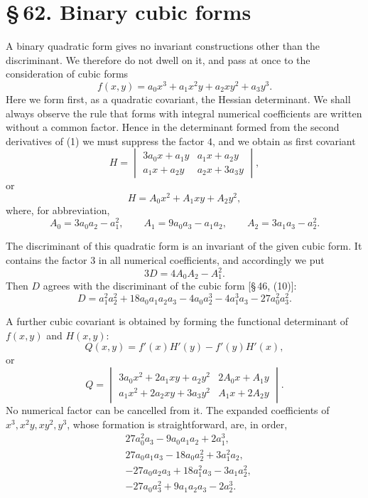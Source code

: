 \documentclass[11pt]{article}
\providecommand{\sect}[2]{\section*{\S\,#1. #2}}
\begin{document}
\clearpage

\sect{62}{Binary cubic forms}

A binary quadratic form gives no invariant constructions other than the discriminant. We therefore do not dwell on it, and pass at once to the consideration of cubic forms
\begin{equation}
 f(x,y)=a_0x^3+a_1x^2y+a_2xy^2+a_3y^3.
\tag{1}
\end{equation}
Here we form first, as a quadratic covariant, the Hessian determinant. We shall always observe the rule that forms with integral numerical coefficients are written without a common factor. Hence in the determinant formed from the second derivatives of (1) we must suppress the factor $4$, and we obtain as first covariant
\[
 H=\begin{vmatrix}
 3a_0x+a_1y & a_1x+a_2y\\
 a_1x+a_2y & a_2x+3a_3y
 \end{vmatrix},
\]
or
\begin{equation}
 H=A_0x^2+A_1xy+A_2y^2,
\tag{2}
\end{equation}
where, for abbreviation,
\begin{equation}
 A_0=3a_0a_2-a_1^2,
 \qquad
 A_1=9a_0a_3-a_1a_2,
 \qquad
 A_2=3a_1a_3-a_2^2.
\tag{3}
\end{equation}

The discriminant of this quadratic form is an invariant of the given cubic form. It contains the factor $3$ in all numerical coefficients, and accordingly we put
\begin{equation}
 3D=4A_0A_2-A_1^2.
\tag{4}
\end{equation}
Then $D$ agrees with the discriminant of the cubic form [\S\,46, (10)]:
\begin{equation}
 D=a_1^2a_2^2+18a_0a_1a_2a_3-4a_0a_2^3-4a_1^3a_3-27a_0^2a_3^2.
\tag{5}
\end{equation}

A further cubic covariant is obtained by forming the functional determinant of $f(x,y)$ and $H(x,y)$:
\begin{equation}
 Q(x,y)=f'(x)H'(y)-f'(y)H'(x),
\tag{6}
\end{equation}
or
\begin{equation}
 Q=\begin{vmatrix}
 3a_0x^2+2a_1xy+a_2y^2 & 2A_0x+A_1y\\
 a_1x^2+2a_2xy+3a_3y^2 & A_1x+2A_2y
 \end{vmatrix}.
\tag{7}
\end{equation}
No numerical factor can be cancelled from it. The expanded coefficients of $x^3,x^2y,xy^2,y^3$, whose formation is straightforward, are, in order,
\[
\begin{aligned}
&27a_0^2a_3-9a_0a_1a_2+2a_1^3,\\
&27a_0a_1a_3-18a_0a_2^2+3a_1^2a_2,\\
&-27a_0a_2a_3+18a_1^2a_3-3a_1a_2^2,\\
&-27a_0a_3^2+9a_1a_2a_3-2a_2^3.
\end{aligned}
\]
\end{document}
